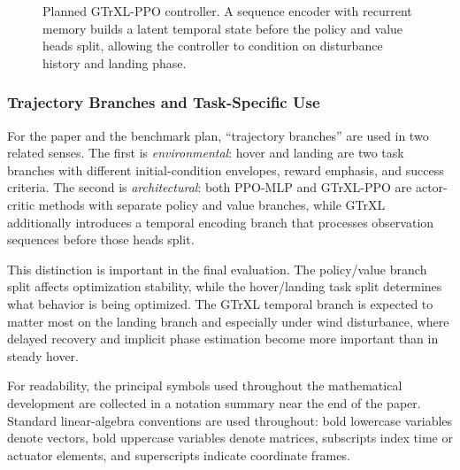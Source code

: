 \documentclass[10pt,twocolumn]{article}
\begin{document}
\begin{figure}[!t]
\caption{Planned GTrXL-PPO controller. A sequence encoder with recurrent memory builds a latent temporal state before the policy and value heads split, allowing the controller to condition on disturbance history and landing phase.}
\label{fig:gtrxl_architecture}
\end{figure}

\subsubsection{Trajectory Branches and Task-Specific Use}

For the paper and the benchmark plan, ``trajectory branches'' are used in two related senses. The first is \emph{environmental}: hover and landing are two task branches with different initial-condition envelopes, reward emphasis, and success criteria. The second is \emph{architectural}: both PPO-MLP and GTrXL-PPO are actor-critic methods with separate policy and value branches, while GTrXL additionally introduces a temporal encoding branch that processes observation sequences before those heads split.

This distinction is important in the final evaluation. The policy/value branch split affects optimization stability, while the hover/landing task split determines what behavior is being optimized. The GTrXL temporal branch is expected to matter most on the landing branch and especially under wind disturbance, where delayed recovery and implicit phase estimation become more important than in steady hover.

For readability, the principal symbols used throughout the mathematical development are collected in a notation summary near the end of the paper. Standard linear-algebra conventions are used throughout: bold lowercase variables denote vectors, bold uppercase variables denote matrices, subscripts index time or actuator elements, and superscripts indicate coordinate frames.
\end{document}
